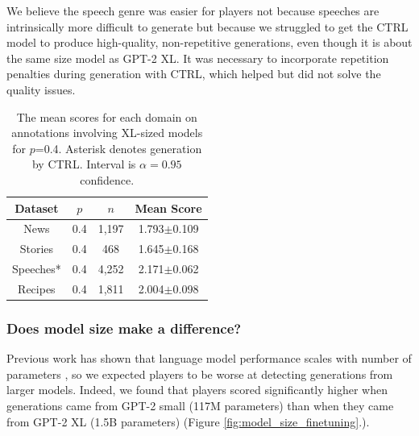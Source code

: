 We believe the speech genre was easier for players not because speeches are intrinsically more difficult to generate but because we struggled to get the CTRL model to produce high-quality, non-repetitive generations, even though it is about the same size model as GPT-2 XL.
It was necessary to incorporate repetition penalties during generation with CTRL, which helped but did not
solve the quality issues.

\begin{table}
\small
\begin{center}
\begin{tabular}{S|SSS} \toprule
    {Dataset} & {$p$} & {$n$} & {Mean Score}\\ \midrule
    {News} & {0.4} & {1,197} & {1.793$\pm$0.109} \\
    {Stories} & {0.4} & {468} & {1.645$\pm$0.168} \\
    {Speeches*} & {0.4} & {4,252} & {2.171$\pm$0.062}\\
    {Recipes} & {0.4} & {1,811} & {2.004$\pm$0.098} \\
    \bottomrule
\end{tabular}
\caption{The mean scores for each domain on annotations involving XL-sized models for $p$=0.4. Asterisk denotes generation by CTRL. Interval is $\alpha=0.95$ confidence.}
\label{tab:scores_per_domain}
\end{center}
\end{table}

\subsubsection{Does model size make a difference?}
Previous work has shown that language model performance scales with number of parameters \citep{kaplan2020scaling}, so we expected players to be worse at detecting generations from larger models.
Indeed, we found that players scored significantly higher when generations came from GPT-2 small (117M parameters) than when they came from GPT-2 XL (1.5B parameters) (Figure \ref{fig:model_size_finetuning}.).



